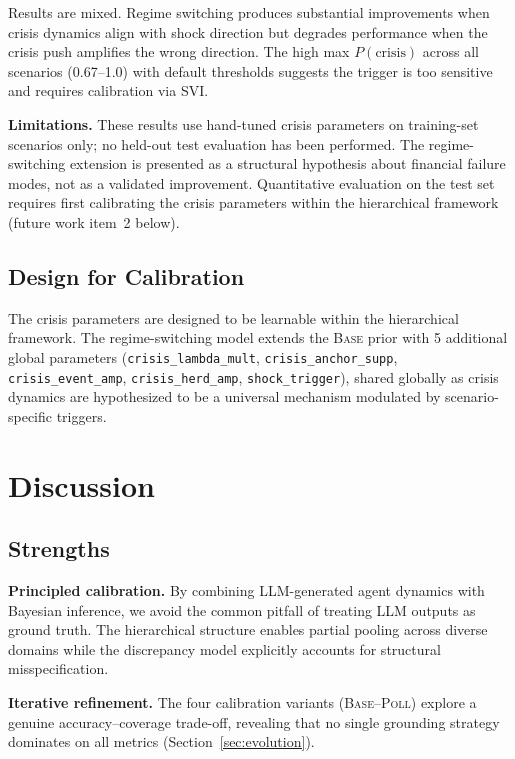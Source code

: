 \documentclass[12pt]{article}
\begin{document}
Results are mixed. Regime switching produces substantial improvements when crisis dynamics align with shock direction but degrades performance when the crisis push amplifies the wrong direction. The high max $P(\text{crisis})$ across all scenarios (0.67--1.0) with default thresholds suggests the trigger is too sensitive and requires calibration via SVI.

\textbf{Limitations.} These results use hand-tuned crisis parameters on training-set scenarios only; no held-out test evaluation has been performed. The regime-switching extension is presented as a structural hypothesis about financial failure modes, not as a validated improvement. Quantitative evaluation on the test set requires first calibrating the crisis parameters within the hierarchical framework (future work item~2 below).

\subsection{Design for Calibration}

The crisis parameters are designed to be learnable within the hierarchical framework. The regime-switching model extends the \textsc{Base} prior with 5 additional global parameters (\texttt{crisis\_lambda\_mult}, \texttt{crisis\_anchor\_supp}, \texttt{crisis\_event\_amp}, \texttt{crisis\_herd\_amp}, \texttt{shock\_trigger}), shared globally as crisis dynamics are hypothesized to be a universal mechanism modulated by scenario-specific triggers.

\section{Discussion}
\label{sec:discussion}

\subsection{Strengths}

\textbf{Principled calibration.} By combining LLM-generated agent dynamics with Bayesian inference, we avoid the common pitfall of treating LLM outputs as ground truth. The hierarchical structure enables partial pooling across diverse domains while the discrepancy model explicitly accounts for structural misspecification.

\textbf{Iterative refinement.} The four calibration variants (\textsc{Base}--\textsc{Poll}) explore a genuine accuracy--coverage trade-off, revealing that no single grounding strategy dominates on all metrics (Section~\ref{sec:evolution}).
\end{document}
